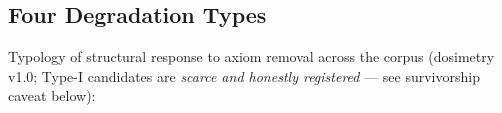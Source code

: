
\subsection{Four Degradation Types}\label{sec:act1-types}

Typology of structural response to axiom removal across the corpus
(dosimetry v1.0; Type-I candidates are \emph{scarce and honestly
registered} --- see survivorship caveat below):

